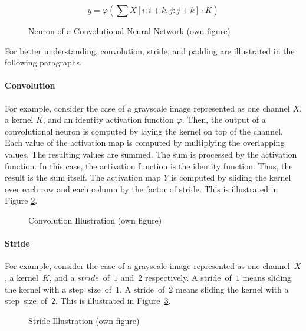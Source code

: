 \begin{equation}
	\label{eq:convneuron}
	y = \varphi(\sum X[i:i+k, j:j+k] \cdot K)
\end{equation}
\begin{figure}[H]
	\centering
	
	\caption{Neuron of a Convolutional Neural Network (own figure)} \label{fig:cnnneuron}
\end{figure}
\par 
For better understanding, convolution, stride, and padding are illustrated in the following paragraphs. 
\paragraph{Convolution}For example, consider the case of a grayscale image represented as one channel $X$, a kernel $K$, and an identity activation function $\varphi$. Then, the output of a convolutional neuron is computed by laying the kernel on top of the channel. Each value of the activation map is computed by multiplying the overlapping values. The resulting values are summed. The sum is processed by the activation function. In this case, the activation function is the identity function. Thus, the result is the sum itself. The activation map $Y$ is computed by sliding the kernel over each row and each column by the factor of stride. This is illustrated in Figure \ref{fig:conv}.\autocite{Goodfellow.2016}
\begin{figure}[H]
	\centering
	
	\caption{Convolution Illustration (own figure)} \label{fig:conv}
\end{figure}
\paragraph{Stride} For example, consider the case of a grayscale image represented as one channel~$X$, a kernel~$K$, and a $stride$~of~$1$ and~$2$ respectively. A stride~of~$1$ means sliding the kernel with a step~size~of~$1$. A stride~of~$2$ means sliding the kernel with a step~size~of~$2$. This is illustrated in Figure~\ref{fig:stride}.\autocite{Goodfellow.2016}
\begin{figure}[H]
	\centering
	
	\caption{Stride Illustration (own figure)} \label{fig:stride}
\end{figure}
